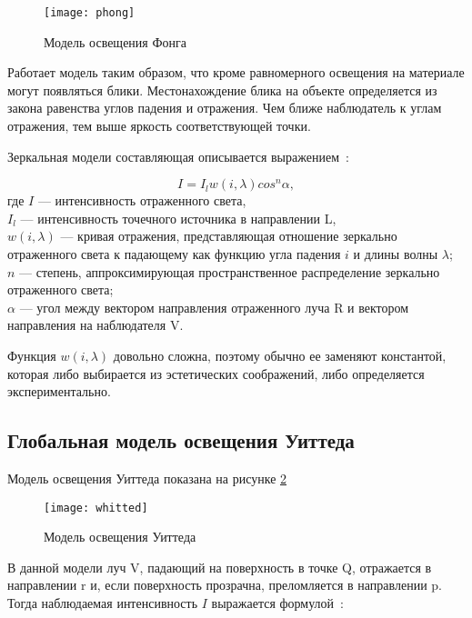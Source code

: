 \begin{figure}[H]
	\centering
	\texttt{[image: phong]}
	\caption{Модель освещения Фонга}
	\label{phong}
\end{figure}

Работает модель
таким образом, что кроме равномерного освещения на материале могут появляться
блики. Местонахождение блика на объекте определяется из закона равенства углов
падения и отражения. Чем ближе наблюдатель к углам отражения, тем выше
яркость соответствующей точки.

Зеркальная модели составляющая описывается выражением~\cite{rojers}:

\begin{equation}\label{phong_ref_eq}
	I = I_l w(i, \lambda) cos^n \alpha,
\end{equation}
где $I$ --- интенсивность отраженного света,\\
\text{~~~~~~}$I_l$ --- интенсивность точечного источника в направлении L,\\
\text{~~~~~~}$w(i, \lambda)$ --- кривая отражения, представляющая отношение зеркально отраженного света к падающему как функцию угла падения $i$ и длины волны $\lambda$;\\
\text{~~~~~~}$n$ --- степень, аппроксимирующая пространственное распределение зеркально отраженного света;\\
\text{~~~~~~}$\alpha$ --- угол между вектором направления отраженного луча R и
вектором направления на наблюдателя V.

Функция $w(i, \lambda)$ довольно
сложна, поэтому обычно ее заменяют константой, которая либо выбирается из
эстетических соображений, либо определяется экспериментально.

\subsection{Глобальная модель освещения Уиттеда}

Модель освещения Уиттеда показана на рисунке \ref{whitted}

\begin{figure}[H]
	\centering
	\texttt{[image: whitted]}
	\caption{Модель освещения Уиттеда}
	\label{whitted}
\end{figure}

В данной модели луч V, падающий на поверхность в точке Q, отражается в
направлении r и, если поверхность прозрачна, преломляется в направлении p. Тогда наблюдаемая интенсивность $I$ выражается формулой~\cite{rojers}:

